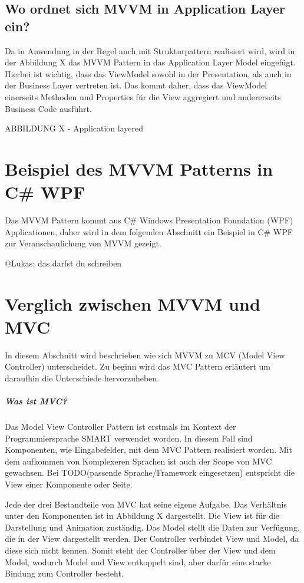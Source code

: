 \documentclass[titlepage=false,12pt]{scrreprt}
\begin{document}
\section{Wo ordnet sich MVVM in Application Layer ein?}

Da in Anwendung in der Regel auch mit Strukturpattern realisiert wird, wird in der Abbildung X
das MVVM Pattern in das Application Layer Model eingefügt. Hierbei ist wichtig, dass das
ViewModel sowohl in der Presentation, als auch in der Business Layer vertreten ist. Das kommt
daher, dass das ViewModel einerseits Methoden und Properties für die View aggregiert und andererseits
Business Code ausführt.  

ABBILDUNG X - Application layered

\chapter{Beispiel des MVVM Patterns in C\# WPF}

Das MVVM Pattern kommt aus C\# Windows Presentation Foundation (WPF) Applicationen, daher
wird in dem folgenden Abschnitt ein Beispiel in C\# WPF zur Veranschaulichung von MVVM gezeigt.


@Lukas: das darfst du schreiben

\chapter{Verglich zwischen MVVM und MVC}

In diesem Abschnitt wird beschrieben wie sich MVVM zu MCV (Model View Controller) unterscheidet. 
Zu beginn wird das MVC Pattern erläutert um daraufhin die Unterschiede hervorzuheben. 

\paragraph{Was ist MVC?}

Das Model View Controller Pattern ist erstmals im Kontext der Programmiersprache SMART verwendet 
worden. In diesem Fall sind Komponenten, wie Eingabefelder, mit dem MVC Pattern realisiert worden.
Mit dem aufkommen von Komplexeren Sprachen ist auch der Scope von MVC gewachsen. Bei TODO(passende Sprache/Framework eingesetzen)
entspricht die View einer Komponente oder Seite.

Jede der drei Bestandteile von MVC hat seine eigene Aufgabe. Das Verhältnis unter den Komponenten
ist in Abbildung X dargestellt. Die View ist für die Darstellung und
Animation zuständig. Das Model stellt die Daten zur Verfügung, die in der View dargestellt werden.
Der Controller verbindet View und Model, da diese sich nicht kennen. Somit steht der Controller 
über der View und dem Model, wodurch Model und View entkoppelt sind, aber darfür eine starke Bindung
zum Controller besteht. 
\end{document}
